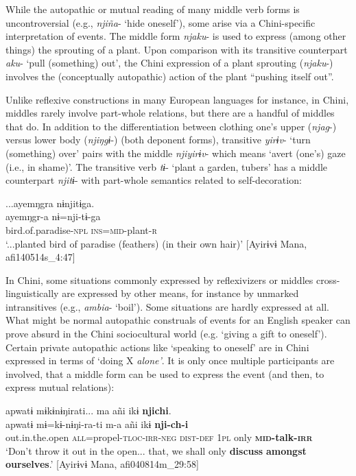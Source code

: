 \documentclass[output=paper]{langscibook}
\begin{document}
 While the autopathic or mutual reading of many middle verb forms is uncontroversial (e.g., \textit{njiña}- ‘hide oneself’), some arise via a Chini-specific interpretation of events. The middle form \textit{njaku}- is used to express (among other things) the sprouting of a plant. Upon comparison with its transitive counterpart \textit{aku}- ‘pull (something) out’, the Chini expression of a plant sprouting (\textit{njaku}-) involves the (conceptually autopathic) action of the plant “pushing itself out”.

 Unlike reflexive constructions in many European languages for instance, in Chini, middles rarely involve part-whole relations, but there are a handful of middles that do. In addition to the differentiation between clothing one’s upper (\textit{njag}-) versus lower body (\textit{njiŋgɨ}-) (both deponent forms), transitive \textit{yirɨv}- ‘turn (something) over’ pairs with the middle \textit{njiyirɨv}- which means ‘avert (one’s) gaze (i.e., in shame)’. The transitive verb \textit{tɨ}- ‘plant a garden, tubers’ has a middle counterpart \textit{njitɨ}- with part-whole semantics related to self-decoration:

\ea\label{ex:brooks:26}
\glll ...ayemŋgra nɨnjitɨga.\\
 ayemŋgr-a nɨ=nji-tɨ-ga\\
bird.of.paradise-\textsc{npl}   \textsc{ins=mid-}plant-\textsc{r}\\
\glt `...planted bird of paradise (feathers) (in their own hair)'
[Ayirɨvɨ Mana, afi140514s\_4:47]
\z


In Chini, some situations commonly expressed by reflexivizers or middles cross-linguistically are expressed by other means, for instance by unmarked intransitives (e.g., \textit{ambia}- ‘boil’). Some situations are hardly expressed at all. What might be normal autopathic construals of events for an English speaker can prove absurd in the Chini sociocultural world (e.g. ‘giving a gift to oneself’). Certain private autopathic actions like ‘speaking to oneself’ are in Chini expressed in terms of ‘doing X \textit{alone’}. It is only once multiple participants are involved, that a middle form can be used to express the event (and then, to express mutual relations):

\ea\label{ex:brooks:27}
\glll apwatɨ   mɨkɨnɨŋirati... ma   añi  ikɨ  \textbf{njichi}.\\
 apwatɨ  mɨ=kɨ-nɨŋi-ra-ti  m-a   añi  ikɨ \textbf{nji-ch-i}\\
out.in.the.open  \textsc{all}=propel\textsc{-tloc-irr-neg  dist-def} \textsc{1pl} only \textbf{\textsc{mid}}\textbf{-talk}\textbf{\textsc{-irr}}\\
\glt `Don’t throw it out in the open... that, we shall only \textbf{discuss} \textbf{amongst} \textbf{ourselves}.' [Ayirɨvɨ Mana, afi040814m\_29:58]
\z
\end{document}
